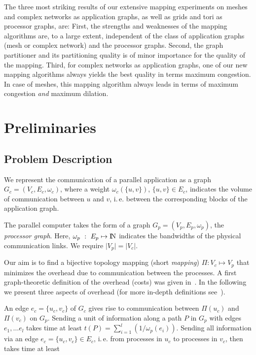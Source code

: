 \documentclass[pdftex]{llncs}
\newcommand{\ie}{i.\,e.\xspace}
\newcommand{\NN}{\mbox{\rm I$\!$N}}
\begin{document}
The three most striking results of our extensive mapping experiments
on meshes and complex networks as application graphs, as well as grids
and tori as processor graphs, are: First, the strengths
and weaknesses of the mapping algorithms are, to a large extent,
independent of the class of application graphs (mesh or complex
network) and the processor graphs. Second, the graph partitioner and
its partitioning quality is of minor importance for the quality
of the mapping. Third, for complex networks as application graphs,
one of our new mapping algorithms always yields the best quality in terms 
maximum congestion. In case of meshes, this mapping algorithm always 
leads in terms of maximum congestion \emph{and} maximum dilation.

\section{Preliminaries}
\label{sec:prelim}
\subsection{Problem Description}
\label{sub:problem}

We represent the communication of a parallel appli\-ca\-tion as a
graph $G_c = (V_c, E_c, \omega_c)$, where a weight $\omega_c(\{u,
v\})$, $\{u, v\} \in E_c$, indicates the volume of communication
between $u$ and $v$, \ie between the corresponding blocks of the
application graph.

The parallel computer takes the form of a graph $G_p = (V_p, E_p,
\omega_p)$, the \emph{processor graph}. Here, $\omega_p~:~E_p \mapsto
\NN$ indicates the bandwidths of the physical communication links. We
require $\vert V_p \vert = \vert V_c \vert$.

Our aim is to find a bijective topology mapping (short \emph{mapping})
$\Pi: V_c \mapsto V_p$ that minimizes the overhead due to
communication between the processes. A first graph-theoretic
definition of the overhead (costs) was given
in~\cite{Rosenberg1980a}. In the following we present three aspects of
overhead (for more in-depth definitions see~\cite{hoefler-topomap}).

An edge $e_c = \{u_c, v_c\}$ of $G_c$ gives rise to communication
between $\Pi(u_c)$ and $\Pi(v_c)$ on $G_p$. Sending a unit of
information along a path $P$ in $G_p$ with edges $e_1, \dots e_l$
takes time at least $t(P) = \sum_{i=1}^l(1 / \omega_p(e_i))$. Sending
all information via an edge $e_c = \{u_c, v_c\} \in E_c$, \ie from
processes in $u_c$ to processes in $v_c$, then takes time at least
\end{document}
